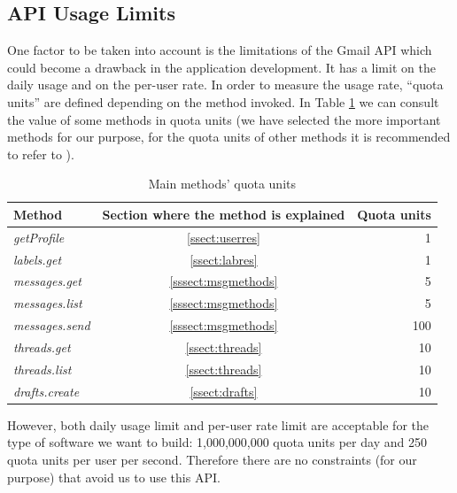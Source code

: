 \subsection{API Usage Limits} \label{ssect:apilimits}
One factor to be taken into account is the limitations of the Gmail API \citep[/v1/reference/quota]{gmailAPI} which could become a drawback in the application development. It has a limit on the daily usage and on the per-user rate. In order to measure the usage rate, ``quota units'' are defined depending on the method invoked. In Table \ref{tab:quotaUnits} we can consult the value of some methods in quota units (we have selected the more important methods for our purpose, for the quota units of other methods it is recommended to refer to \cite[/v1/reference/quota]{gmailAPI}).

\begin{table}[h]
	\centering
	\begin{tabular}{|l c r|}
		\hline
		\textbf{Method} & \textbf{Section where the method is explained} & \textbf{Quota units} \\
		\hline\hline
		\textit{getProfile} & \ref{ssect:userres} & 1\\ \hline
		\textit{labels.get} & \ref{ssect:labres} & 1\\ \hline
		\textit{messages.get} & \ref{sssect:msgmethods} & 5\\ \hline
		\textit{messages.list} & \ref{sssect:msgmethods} & 5\\ \hline
		\textit{messages.send} & \ref{sssect:msgmethods} & 100\\ \hline
		\textit{threads.get} & \ref{ssect:threads} & 10\\ \hline
		\textit{threads.list} & \ref{ssect:threads} & 10\\ \hline
		\textit{drafts.create} & \ref{ssect:drafts} & 10\\ \hline
	\end{tabular}
	\caption{Main methods' quota units}
	\label{tab:quotaUnits}
\end{table}

However, both daily usage limit and per-user rate limit are acceptable for the type of software we want to build: 1,000,000,000 quota units per day and 250 quota units per user per second. Therefore there are no constraints (for our purpose) that avoid us to use this API.
